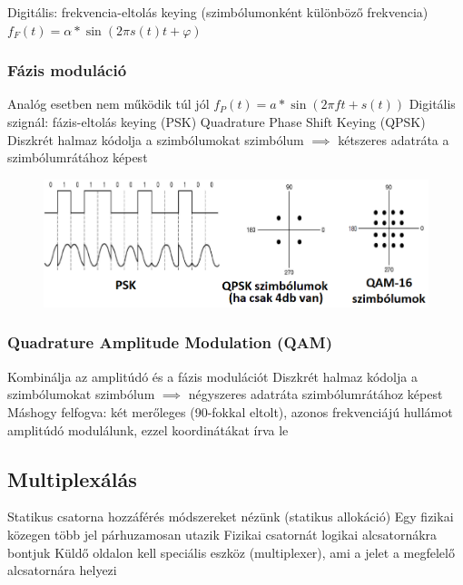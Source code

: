 \documentclass[12pt,a4paper]{article}
\begin{document}
\begin{outline}
	\1 Digitális: frekvencia-eltolás keying (szimbólumonként különböző frekvencia)
	\1 $f_F(t) = \alpha*\sin(2 \pi s(t) t + \varphi)$
\end{outline}

\pagebreak

\subsubsection{Fázis moduláció}

\begin{outline}
	\1 Analóg esetben nem működik túl jól
	\1 $f_P(t) = a * \sin(2 \pi f t + s(t))$
	\1 Digitális szignál: fázis-eltolás keying (PSK)
	\1 Quadrature Phase Shift Keying (QPSK)
		\2 Diszkrét halmaz kódolja a szimbólumokat
		 szimbólum $\implies$ kétszeres adatráta a szimbólumrátához képest
\end{outline}

\begin{figure}[h!]
	\centering
	\includegraphics[width=0.75\linewidth]{phase-modulation-and-qam}
\end{figure}

\subsubsection{Quadrature Amplitude Modulation (QAM)}

\begin{outline}
	\1 Kombinálja az amplitúdó és a fázis modulációt
	\1 Diszkrét halmaz kódolja a szimbólumokat
		 szimbólum $\implies$ négyszeres adatráta szimbólumrátához képest
	\1 Máshogy felfogva: két merőleges (90-fokkal eltolt), azonos frekvenciájú hullámot amplitúdó modulálunk, ezzel koordinátákat írva le
\end{outline}

\pagebreak

\subsection{Multiplexálás}

\begin{outline}
	\1 Statikus csatorna hozzáférés módszereket nézünk (statikus allokáció)
	\1 Egy fizikai közegen több jel párhuzamosan utazik
		\2 Fizikai csatornát logikai alcsatornákra bontjuk
	\1 Küldő oldalon kell speciális eszköz (multiplexer), ami a jelet a megfelelő alcsatornára helyezi
\end{outline}
\end{document}

